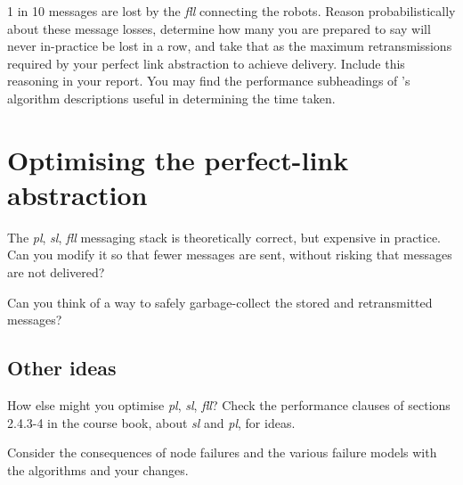 \documentclass[a4paper]{article}
\begin{document}
1 in 10 messages are lost by the \emph{fll} connecting the robots. Reason
probabilistically about these message losses, determine how many you are
prepared to say will never in-practice be lost in a row, and take that as the
maximum retransmissions required by your perfect link abstraction to achieve
delivery. Include this reasoning in your report. You may find the performance
subheadings of \cite{cachin2011}'s algorithm descriptions useful in
determining the time taken.










\section{Optimising the perfect-link abstraction} %
\label{sub:optimising_pl}

The \emph{pl}, \emph{sl}, \emph{fll} messaging stack is theoretically correct,
but expensive in practice. Can you modify it so that fewer messages are sent,
without risking that messages are not delivered?

Can you think of a way to safely garbage-collect the stored and retransmitted
messages?




\subsection{Other ideas} %
\label{ssub:other_ideas}

How else might you optimise \emph{pl}, \emph{sl}, \emph{fll}? Check the performance clauses of
sections 2.4.3-4 in the course book, about \emph{sl} and \emph{pl}, for ideas.

Consider the consequences of node failures and the various failure models
with the algorithms and your changes.


\end{document}
